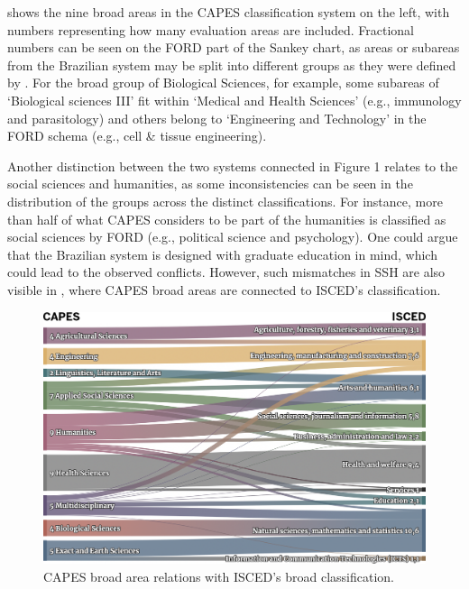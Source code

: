  shows the nine broad areas in the CAPES classification system on the left, with numbers representing how many evaluation areas are included. Fractional numbers can be seen on the FORD part of the Sankey chart, as areas or subareas from the Brazilian system may be split into different groups as they were defined by \textcite{OECD.2015fr}. For the broad group of Biological Sciences, for example, some subareas of ‘Biological sciences III’ fit within ‘Medical and Health Sciences’ (e.g., immunology and parasitology) and others belong to ‘Engineering and Technology’ in the FORD schema (e.g., cell \& tissue engineering).

Another distinction between the two systems connected in Figure 1 relates to the social sciences and humanities, as some inconsistencies can be seen in the distribution of the groups across the distinct classifications. For instance, more than half of what CAPES considers to be part of the humanities is classified as social sciences by FORD (e.g., political science and psychology). One could argue that the Brazilian system is designed with graduate education in mind, which could lead to the observed conflicts. However, such mismatches in SSH are also visible in , where CAPES broad areas are connected to ISCED’s classification.

\begin{figure}[ht]
\vspace{8pt}
    \centering
    \includegraphics[width=1\textwidth]{images/chapter_classific/capes_isced.png}
    \caption{CAPES broad area relations with ISCED’s broad classification.}
    \label{fig:classif:capes_isced}
\end{figure}
 
